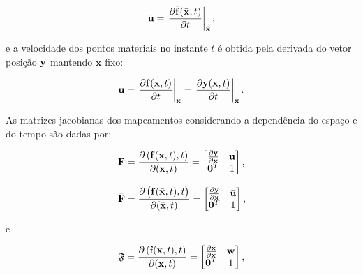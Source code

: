 \documentclass[tese_patricia]{subfiles}%
\begin{document}
\begin{align}
	\bar{\mathbf{u}} = \left. \frac{\partial \bar{\mathbf{f}}(\bar{\mathbf{x}},t)}{\partial t} \right|_{\bar{\mathbf{x}}},
\end{align}

\noindent e a velocidade dos pontos materiais no instante $t$ é obtida pela derivada do vetor posição $\mathbf{y}$ mantendo $\mathbf{x}$ fixo:

\begin{align}
	\mathbf{u} = \left. \frac{\partial \mathbf{f}(\mathbf{x},t)}{\partial t} \right|_{\mathbf{x}} = \left. \frac{\partial \mathbf{y}(\mathbf{x},t)}{\partial t} \right|_{\mathbf{x}}.
\end{align}


As matrizes jacobianas dos mapeamentos considerando a dependência do espaço e do tempo são dadas por:

\begin{equation} \label{eq:ALEJac1}
	\mathbf{F} = \frac{\partial \left(\mathbf{f}(\mathbf{x},t),t\right)}{\partial (\mathbf{x},t)}=
	\begin{bmatrix}
		\frac{\partial {\mathbf{y}}}{\partial {\mathbf{x}}} & \mathbf{u} \\
		\mathbf{0}^T & 1 \\
	\end{bmatrix}
	\text{,}
\end{equation}

\begin{equation} \label{eq:ALEJac2}
	\bar{\mathbf{F}} = \frac{\partial \left(\bar{\mathbf{f}}(\bar{\mathbf{x}},t),t\right)}{\partial (\bar{\mathbf{x}},t)}=
	\begin{bmatrix}
		\frac{\partial {\mathbf{y}}}{\partial {\bar{\mathbf{x}}}} & \bar{\mathbf{u}} \\
		\mathbf{0}^T & 1 \\
	\end{bmatrix}
	\text{,}
\end{equation}

e

\begin{equation} \label{eq:ALEJac3}
	\mathfrak{F} = \frac{\partial \left({\mathfrak{f}}(\mathbf{x},t),t\right)}{\partial (\mathbf{x},t)}=
	\begin{bmatrix}
		\frac{\partial {\bar{\mathbf{x}}}}{\partial {\mathbf{x}}} & \mathbf{w} \\
		\mathbf{0}^T & 1 \\
	\end{bmatrix}
	\text{,}
\end{equation}
\end{document}
